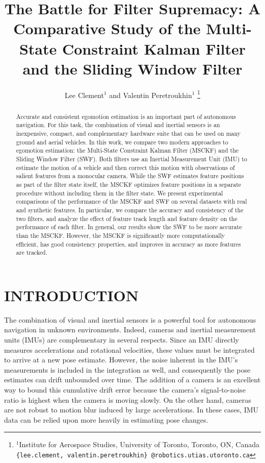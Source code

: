 \documentclass[letterpaper, 10 pt, conference]{ieeeconf}  %
\title{\LARGE \bf
The Battle for Filter Supremacy: A Comparative Study of the Multi-State Constraint Kalman Filter and the Sliding Window Filter
}
\author{Lee Clement$^{1}$ and Valentin Peretroukhin$^{1}$%
\thanks{$^{1}$Institute for Aerospace Studies,
        University of Toronto, Toronto, ON, Canada
        {\tt \{lee.clement, valentin.peretroukhin\} @robotics.utias.utoronto.ca}
        }%
}
\begin{document}
\maketitle
\thispagestyle{empty}
\pagestyle{empty}


\begin{abstract}
Accurate and consistent egomotion estimation is an important part of autonomous navigation.
For this task, the combination of visual and inertial sensors is an inexpensive, compact, and complementary hardware suite that can be used on many ground and aerial vehicles.
In this work, we compare two modern approaches to egomotion estimation: the Multi-State Constraint Kalman Filter (MSCKF) and the Sliding Window Filter (SWF).
Both filters use an Inertial Measurement Unit (IMU) to estimate the motion of a vehicle and then correct this motion with observations of salient features from a monocular camera.
While the SWF estimates feature positions as part of the filter state itself, the MSCKF optimizes feature positions in a separate procedure without including them in the filter state.
We present experimental comparisons of the performance of the MSCKF and SWF on several datasets with real and synthetic features.
In particular, we compare the accuracy and consistency of the two filters, and analyze the effect of feature track length and feature density on the performance of each filter.
In general, our results show the SWF to be more accurate than the MSCKF.
However, the MSCKF is significantly more computationally efficient, has good consistency properties, and improves in accuracy as more features are tracked. 
\end{abstract}


\section{INTRODUCTION} \label{sec:introduction}

The combination of visual and inertial sensors is a powerful tool for autonomous navigation in unknown environments.
Indeed, cameras and inertial measurement units (IMUs) are complementary in several respects.
Since an IMU directly measures accelerations and rotational velocities, these values must be integrated to arrive at a new pose estimate.
However, the noise inherent in the IMU's measurements is included in the integration as well, and consequently the pose estimates can drift unbounded over time.
The addition of a camera is an excellent way to bound this cumulative drift error because the camera's signal-to-noise ratio is highest when the camera is moving slowly.
On the other hand, cameras are not robust to motion blur induced by large accelerations.
In these cases, IMU data can be relied upon more heavily in estimating pose changes.
\end{document}
